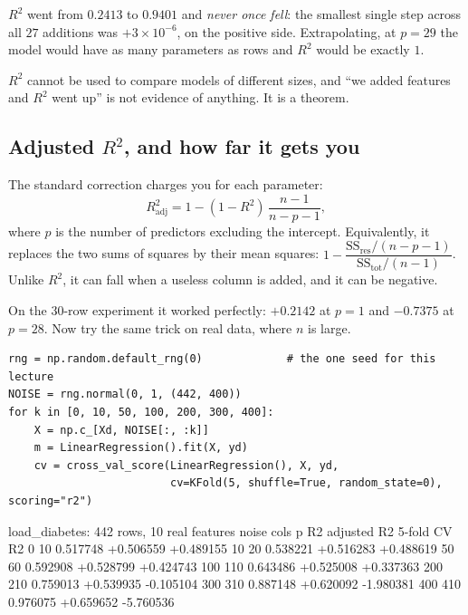 \documentclass[11pt]{article}
\begin{document}
$R^2$ went from $0.2413$ to $0.9401$ and \emph{never once fell}: the smallest
single step across all $27$ additions was $+3\times10^{-6}$, on the positive
side. Extrapolating, at $p = 29$ the model would have as many parameters as
rows and $R^2$ would be exactly $1$.

\begin{caution}
$R^2$ cannot be used to compare models of different sizes, and ``we added
features and $R^2$ went up'' is not evidence of anything. It is a theorem.
\end{caution}

\subsection{Adjusted $R^2$, and how far it gets you}
\label{sec:adjr2}

The standard correction charges you for each parameter:
\begin{equation}
  R^2_{\mathrm{adj}} = 1 - (1 - R^2)\,\frac{n-1}{n-p-1},
  \label{eq:adj}
\end{equation}
where $p$ is the number of predictors excluding the intercept. Equivalently,
it replaces the two sums of squares by their mean squares:
$1 - \dfrac{\mathrm{SS_{res}}/(n-p-1)}{\mathrm{SS_{tot}}/(n-1)}$. Unlike
$R^2$, it can fall when a useless column is added, and it can be negative.

On the $30$-row experiment it worked perfectly: $+0.2142$ at $p = 1$ and
$\mathbf{-0.7375}$ at $p = 28$. Now try the same trick on real data, where $n$
is large.

\begin{lstlisting}
rng = np.random.default_rng(0)             # the one seed for this lecture
NOISE = rng.normal(0, 1, (442, 400))
for k in [0, 10, 50, 100, 200, 300, 400]:
    X = np.c_[Xd, NOISE[:, :k]]
    m = LinearRegression().fit(X, yd)
    cv = cross_val_score(LinearRegression(), X, yd,
                         cv=KFold(5, shuffle=True, random_state=0), scoring="r2")
\end{lstlisting}
\begin{codeout}
load_diabetes: 442 rows, 10 real features
  noise cols    p     R2        adjusted R2   5-fold CV R2
       0        10   0.517748   +0.506559     +0.489155
      10        20   0.538221   +0.516283     +0.488619
      50        60   0.592908   +0.528799     +0.424743
     100       110   0.643486   +0.525008     +0.337363
     200       210   0.759013   +0.539935     -0.105104
     300       310   0.887148   +0.620092     -1.980381
     400       410   0.976075   +0.659652     -5.760536
\end{codeout}
\end{document}
